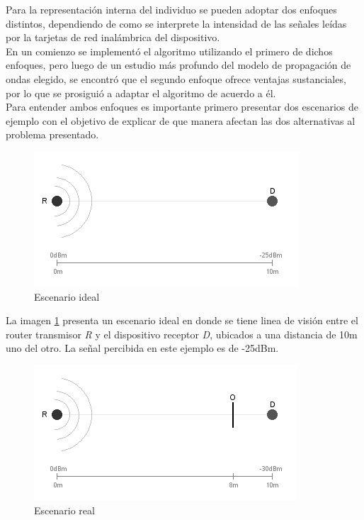\documentclass[journal]{IEEEtran}
\begin{document}
Para la representación interna del individuo se pueden adoptar dos enfoques distintos, dependiendo de como se interprete la intensidad de las señales leídas por la tarjetas de red inalámbrica del dispositivo.\\

En un comienzo se implementó el algoritmo utilizando el primero de dichos enfoques, pero luego de un estudio más profundo del modelo de propagación de ondas elegido, se encontró que el segundo enfoque ofrece ventajas sustanciales, por lo que se prosiguió a adaptar el algoritmo de acuerdo a él.\\

Para entender ambos enfoques es importante primero presentar dos escenarios de ejemplo con el objetivo de explicar de que manera afectan las dos alternativas al problema presentado.\\

\begin{figure}[h]
\centering
\includegraphics[width=\linewidth]{ideal.png}
\caption{Escenario ideal}
\label{fig:ideal}
\end{figure}

La imagen \ref{fig:ideal} presenta un escenario ideal en donde se tiene linea de visión entre el router transmisor \emph{R} y el dispositivo receptor \emph{D}, ubicados a una distancia de 10m uno del otro. La señal percibida en este ejemplo es de -25dBm.\\

\begin{figure}[h]
\centering
\includegraphics[width=\linewidth]{obstacle.png}
\caption{Escenario real}
\label{fig:obstacle}
\end{figure}
\end{document}
